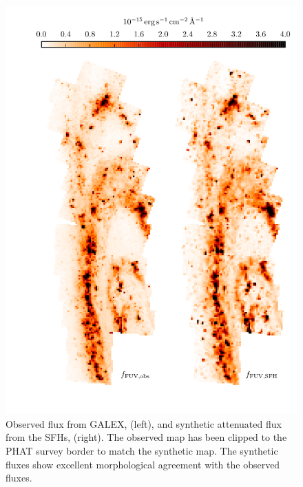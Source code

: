 \begin{figure}
\centering
\includegraphics[scale=0.9]{m31flux-figures/fluxmaps_fuv.pdf}
\caption[Observed and synthetic attenuated \fuv{} flux maps.]{Observed \fuv{} flux from
    GALEX, \ffuvobs{} (left), and synthetic attenuated \fuv{} flux from the
    SFHs, \ffuvsfh{} (right). The observed map has been clipped to the PHAT
    survey border to match the synthetic map. The synthetic fluxes show
    excellent morphological agreement with the observed fluxes.
}
\label{fig:mfx:fluxmaps_fuv}
\end{figure}



